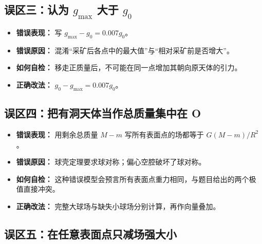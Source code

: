 \documentclass[
  11pt,
  UTF8]{ctexart}
\providecommand{\tightlist}{%
  \setlength{\itemsep}{0pt}\setlength{\parskip}{0pt}}
\begin{document}
\hypertarget{ux8befux533aux4e09ux8ba4ux4e3a-g_max-ux5927ux4e8e-g_0}{%
\subsection{\texorpdfstring{误区三：认为 \(g_{\max}\) 大于
\(g_0\)}{误区三：认为 g\_\{\textbackslash max\} 大于 g\_0}}\label{ux8befux533aux4e09ux8ba4ux4e3a-g_max-ux5927ux4e8e-g_0}}

\begin{itemize}
\tightlist
\item
  \textbf{错误表现：} 写 \(g_{\max}-g_0=0.007g_0\)。
\item
  \textbf{错误原因：}
  混淆``采矿后各点中的最大值''与``相对采矿前是否增大''。
\item
  \textbf{如何自检：}
  移走正质量后，不可能在同一点增加其朝向原天体的引力。
\item
  \textbf{正确改法：} \(g_0-g_{\max}=0.007g_0\)。
\end{itemize}

\hypertarget{ux8befux533aux56dbux628aux6709ux6d1eux5929ux4f53ux5f53ux4f5cux603bux8d28ux91cfux96c6ux4e2dux5728-o}{%
\subsection{误区四：把有洞天体当作总质量集中在
O}\label{ux8befux533aux56dbux628aux6709ux6d1eux5929ux4f53ux5f53ux4f5cux603bux8d28ux91cfux96c6ux4e2dux5728-o}}

\begin{itemize}
\tightlist
\item
  \textbf{错误表现：} 用剩余总质量 \(M-m\) 写所有表面点的场都等于
  \(G(M-m)/R^2\)。
\item
  \textbf{错误原因：} 球壳定理要求球对称；偏心空腔破坏了球对称。
\item
  \textbf{如何自检：}
  这种错误模型会预言所有表面点重力相同，与题目给出的两个极值直接冲突。
\item
  \textbf{正确改法：} 完整大球场与缺失小球场分别计算，再作向量叠加。
\end{itemize}

\hypertarget{ux8befux533aux4e94ux5728ux4efbux610fux8868ux9762ux70b9ux53eaux51cfux573aux5f3aux5927ux5c0f}{%
\subsection{误区五：在任意表面点只减场强大小}\label{ux8befux533aux4e94ux5728ux4efbux610fux8868ux9762ux70b9ux53eaux51cfux573aux5f3aux5927ux5c0f}}
\end{document}
